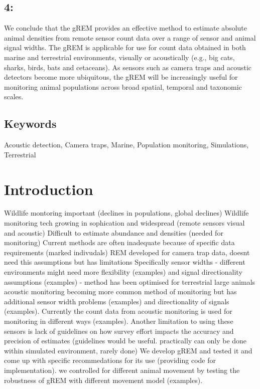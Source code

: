 \documentclass[a4paper,10pt,reqno,oneside]{amsart}
\begin{document}
\subsection*{4:} We conclude that the gREM provides an effective method to estimate absolute animal densities from remote sensor count data over a range of sensor and animal signal widths. The gREM is applicable for use for count data obtained in both marine and terrestrial environments, visually or acoustically (e.g., big cats, sharks, birds, bats and cetaceans). As sensors such as camera traps and acoustic detectors become more ubiquitous, the gREM will be increasingly useful for monitoring animal populations across broad spatial, temporal and taxonomic scales. 

\subsection{Keywords} %
Acoustic detection, Camera traps, Marine, Population monitoring, Simulations, Terrestrial 

\section{Introduction}

Wildlife montoring important (declines in populations, global declines)
Wildlife monitoring tech growing in sophication and widespread (remote sensors visual and acoustic)
Difficult to estimate abundance and densities (needed for monitoring)
Current methods are often inadequate because of specific data requirements (marked indivudals)
REM developed for camera trap data, doesnt need this assumptions 
but has limitations
Specifically sensor widths - different environments might need more flexibility (examples) and signal directionality assumptions (examples) - method has been optimised for terrestrial large animals
acoustic monitoring becoming more common method of monitoring but has additional sensor width problems (examples) and directionality of signals (examples). 
Currently the count data from acoustic monitoring is used for monitoring in different ways (examples). 
Another limitation to using these sensors is lack of guidelines on how survey effort impacts the accuracy and precision of estimates (guidelines would be useful. practically can only be done within simulated environment, rarely done)
We develop gREM and tested it and come up with specific recommedations for its use (providing code for implementation). we controlled for different animal movement by testing the robustness of gREM with different movement model (examples).
\end{document}
